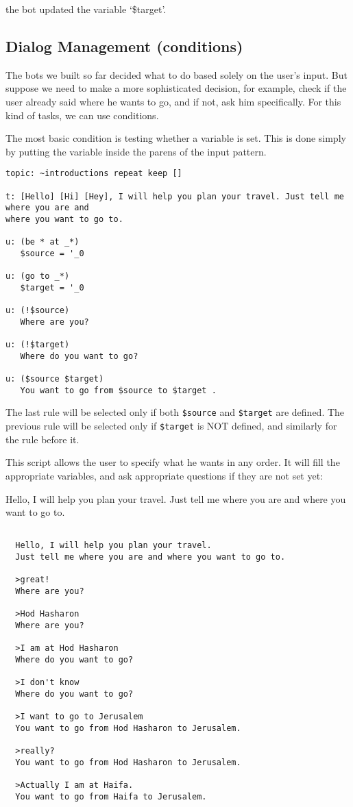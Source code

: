 \documentclass[]{article}
\begin{document}
the bot updated the variable `\$target'.

\subsection{Dialog Management
(conditions)}\label{dialog-management-conditions}

The bots we built so far decided what to do based solely on the user's
input. But suppose we need to make a more sophisticated decision, for
example, check if the user already said where he wants to go, and if
not, ask him specifically. For this kind of tasks, we can use
conditions.

The most basic condition is testing whether a variable is set. This is
done simply by putting the variable inside the parens of the input
pattern.

\begin{verbatim}
topic: ~introductions repeat keep []

t: [Hello] [Hi] [Hey], I will help you plan your travel. Just tell me where you are and
where you want to go to.

u: (be * at _*)
   $source = '_0

u: (go to _*)
   $target = '_0

u: (!$source)
   Where are you?

u: (!$target)
   Where do you want to go?

u: ($source $target)
   You want to go from $source to $target .
\end{verbatim}

The last rule will be selected only if both \texttt{\$source} and
\texttt{\$target} are defined. The previous rule will be selected only
if \texttt{\$target} is NOT defined, and similarly for the rule before
it.

This script allows the user to specify what he wants in any order. It
will fill the appropriate variables, and ask appropriate questions if
they are not set yet:

Hello, I will help you plan your travel. Just tell me where you are and
where you want to go to.

\begin{verbatim}

  Hello, I will help you plan your travel. 
  Just tell me where you are and where you want to go to.

  >great!
  Where are you?

  >Hod Hasharon
  Where are you?

  >I am at Hod Hasharon
  Where do you want to go?

  >I don't know
  Where do you want to go?

  >I want to go to Jerusalem
  You want to go from Hod Hasharon to Jerusalem.

  >really?
  You want to go from Hod Hasharon to Jerusalem.

  >Actually I am at Haifa.
  You want to go from Haifa to Jerusalem.
\end{verbatim}
\end{document}
